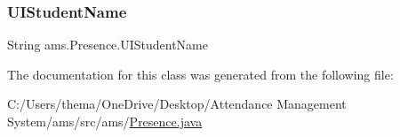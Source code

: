 \subsubsection{\texorpdfstring{UIStudentName}{UIStudentName}}
{\footnotesize\ttfamily String ams.\+Presence.\+U\+I\+Student\+Name\hspace{0.3cm}{\ttfamily [static]}}



The documentation for this class was generated from the following file\+:\begin{DoxyCompactItemize}
\item 
C\+:/\+Users/thema/\+One\+Drive/\+Desktop/\+Attendance Management System/ams/src/ams/\mbox{\hyperlink{_presence_8java}{Presence.\+java}}\end{DoxyCompactItemize}

